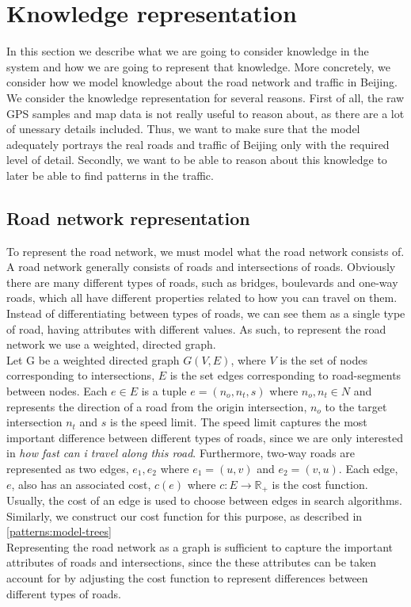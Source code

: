 \section{Knowledge representation}
In this section we describe what we are going to consider knowledge in the system and how we are going to represent that knowledge. More concretely, we consider how we model knowledge about the road network and traffic in Beijing. We consider the knowledge representation for several reasons. First of all, the raw GPS samples and map data is not really useful to reason about, as there are a lot of unessary details included. Thus, we want to make sure that the model adequately portrays the real roads and traffic of Beijing only with the required level of detail. Secondly, we want to be able to reason about this knowledge to later be able to find patterns in the traffic.

\subsection{Road network representation}
To represent the road network, we must model what the road network consists of. A road network generally consists of roads and intersections of roads. Obviously there are many different types of roads, such as bridges, boulevards and one-way roads, which all have different properties related to how you can travel on them. Instead of differentiating between types of roads, we can see them as a single type of road, having attributes with different values. As such, to represent the road network we use a weighted, directed graph.\\
Let G be a weighted directed graph $G(V,E)$, where $V$ is the set of nodes corresponding to intersections, $E$ is the set edges corresponding to road-segments between nodes. Each $e \in E$ is a tuple $e=(n_o, n_t, s)$ where $n_o, n_t \in N$ and represents the direction of a road from the origin intersection, $n_o$ to the target intersection $n_t$ and $s$ is the speed limit. The speed limit captures the most important difference between different types of roads, since we are only interested in \emph{how fast can i travel along this road}. Furthermore, two-way roads are represented as two edges, $e_1, e_2$ where $e_1 = (u, v)$ and $e_2=(v, u)$. Each edge, $e$, also has an associated cost, $c(e)$ where  $c: E \rightarrow \mathbb R_+$ is the cost function. Usually, the cost of an edge is used to choose between edges in search algorithms. Similarly, we construct our cost function for this purpose, as described in \ref{patterns:model-trees}
\\
Representing the road network as a graph is sufficient to capture the important attributes of roads and intersections, since the these attributes can be taken account for by adjusting the cost function to represent differences between different types of roads. 

